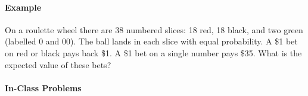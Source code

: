 \documentclass[10pt]{article}\usepackage[]{graphicx}\usepackage[]{color}
\begin{document}
\paragraph{Example}

On a roulette wheel there are 38 numbered slices: 18 red, 18 black, and two green (labelled 0 and 00). The ball lands in each slice with equal probability. A \$1 bet on red or black pays back \$1. A \$1 bet on a single number pays \$35. What is the expected value of these bets? 

\vspace{1.5in}

\paragraph{In-Class Problems}
\end{document}
